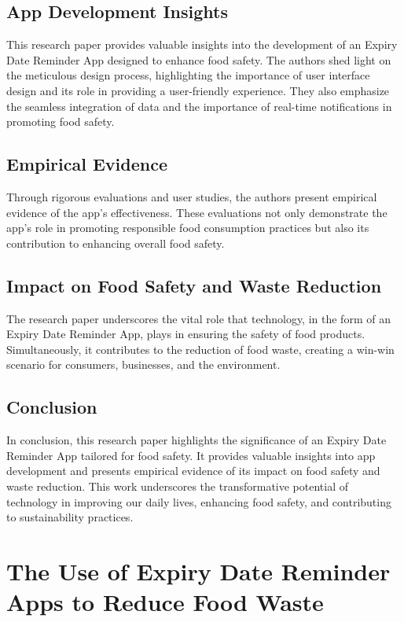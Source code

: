 \subsection{App Development Insights}
This research paper provides valuable insights into the development of an Expiry Date Reminder App designed to enhance food safety. The authors shed light on the meticulous design process, highlighting the importance of user interface design and its role in providing a user-friendly experience. They also emphasize the seamless integration of data and the importance of real-time notifications in promoting food safety.

\subsection{Empirical Evidence}
Through rigorous evaluations and user studies, the authors present empirical evidence of the app's effectiveness. These evaluations not only demonstrate the app's role in promoting responsible food consumption practices but also its contribution to enhancing overall food safety.

\subsection{Impact on Food Safety and Waste Reduction}
The research paper underscores the vital role that technology, in the form of an Expiry Date Reminder App, plays in ensuring the safety of food products. Simultaneously, it contributes to the reduction of food waste, creating a win-win scenario for consumers, businesses, and the environment.

\subsection{Conclusion}
In conclusion, this research paper highlights the significance of an Expiry Date Reminder App tailored for food safety. It provides valuable insights into app development and presents empirical evidence of its impact on food safety and waste reduction. This work underscores the transformative potential of technology in improving our daily lives, enhancing food safety, and contributing to sustainability practices.



\section{The Use of Expiry Date Reminder Apps to Reduce Food Waste}

